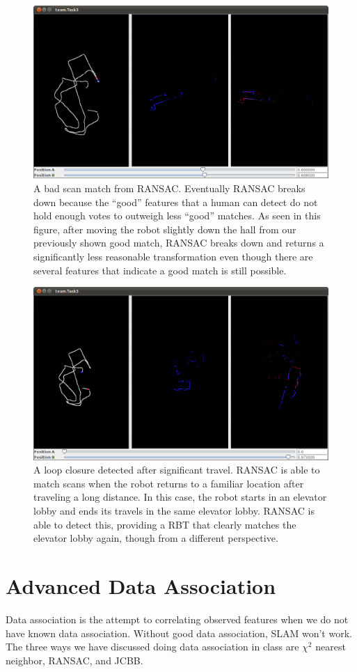 \documentclass[12pt]{article}
\begin{document}
\begin{figure}[h!]
\centering
\includegraphics[width=.7\textwidth]{figures/Task3_bad0.png}
\caption{A bad scan match from RANSAC. Eventually RANSAC breaks down because the
    ``good'' features that a human can detect do not hold enough votes to outweigh
    less ``good'' matches. As seen in this figure, after moving the robot slightly
    down the hall from our previously shown good match, RANSAC breaks down and
    returns a significantly less reasonable transformation even though there are
    several features that indicate a good match is still possible.}
\label{fig:bad_ransac0}
\end{figure}

\begin{figure}[h!]
\centering
\includegraphics[width=.7\textwidth]{figures/Task3_good_endpoints.png}
\caption{A loop closure detected after significant travel. RANSAC is able to match
    scans when the robot returns to a familiar location after traveling a long
    distance. In this case, the robot starts in an elevator lobby and ends its
    travels in the same elevator lobby. RANSAC is able to detect this, providing a
    RBT that clearly matches the elevator lobby again, though from a different
    perspective.}
\label{fig:long_ransac}
\end{figure}
\section{Advanced Data Association }
	Data association is the attempt to correlating observed features when we do
not have known data association.  Without good data association, SLAM won't work.
The three ways we have discussed doing data association in class are $\chi^2$
nearest neighbor, RANSAC, and JCBB.
\end{document}
